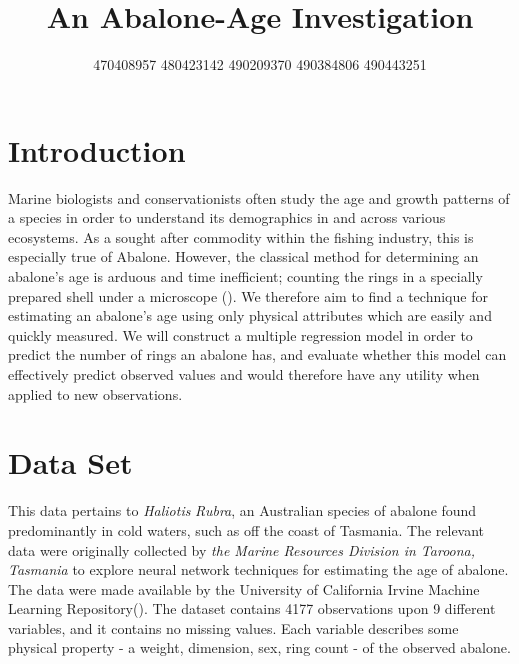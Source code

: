\documentclass[letterpaper,9pt,twocolumn,twoside,]{pinp}
\title{An Abalone-Age Investigation}
\author[]{\textbar{} 470408957 \textbar{} 480423142 \textbar{} 490209370
\textbar{} 490384806 \textbar{} 490443251 \textbar{}}
\begin{document}
\verticaladjustment{-2pt}

\maketitle
\thispagestyle{firststyle}



\hypertarget{introduction}{%
\section{Introduction}\label{introduction}}

Marine biologists and conservationists often study the age and growth
patterns of a species in order to understand its demographics in and
across various ecosystems. As a sought after commodity within the
fishing industry, this is especially true of Abalone. However, the
classical method for determining an abalone's age is arduous and time
inefficient; counting the rings in a specially prepared shell under a
microscope (\cite{Dua:2019}). We therefore aim to find a technique for
estimating an abalone's age using only physical attributes which are
easily and quickly measured. We will construct a multiple regression
model in order to predict the number of rings an abalone has, and
evaluate whether this model can effectively predict observed values and
would therefore have any utility when applied to new observations.

\hypertarget{data-set}{%
\section{Data Set}\label{data-set}}

This data pertains to \emph{Haliotis} \emph{Rubra}, an Australian
species of abalone found predominantly in cold waters, such as off the
coast of Tasmania. The relevant data were originally collected by
\emph{the Marine Resources Division in Taroona, Tasmania} to explore
neural network techniques for estimating the age of abalone. The data
were made available by the University of California Irvine Machine
Learning Repository(\cite{Dua:2019}). The dataset contains 4177
observations upon 9 different variables, and it contains no missing
values. Each variable describes some physical property - a weight,
dimension, sex, ring count - of the observed abalone.
\end{document}
